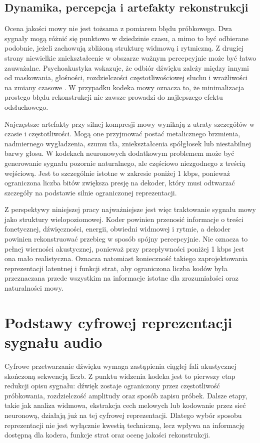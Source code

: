 \subsection{Dynamika, percepcja i artefakty rekonstrukcji}
\label{subsec:dynamika-percepcja-artefakty}

Ocena jakości mowy nie jest tożsama z pomiarem błędu próbkowego. Dwa sygnały mogą różnić się punktowo w dziedzinie czasu, a mimo to być odbierane podobnie, jeżeli zachowują zbliżoną strukturę widmową i rytmiczną. Z drugiej strony niewielkie zniekształcenie w obszarze ważnym percepcyjnie może być łatwo zauważalne. Psychoakustyka wskazuje, że odbiór dźwięku zależy między innymi od maskowania, głośności, rozdzielczości częstotliwościowej słuchu i wrażliwości na zmiany czasowe \cite{ZwickerFastl1999Psychoacoustics}. W przypadku kodeka mowy oznacza to, że minimalizacja prostego błędu rekonstrukcji nie zawsze prowadzi do najlepszego efektu odsłuchowego.

Najczęstsze artefakty przy silnej kompresji mowy wynikają z utraty szczegółów w czasie i częstotliwości. Mogą one przyjmować postać metalicznego brzmienia, nadmiernego wygładzenia, szumu tła, zniekształcenia spółgłosek lub niestabilnej barwy głosu. W kodekach neuronowych dodatkowym problemem może być generowanie sygnału pozornie naturalnego, ale częściowo niezgodnego z treścią wejściową. Jest to szczególnie istotne w zakresie poniżej 1 kbps, ponieważ ograniczona liczba bitów zwiększa presję na dekoder, który musi odtwarzać szczegóły na podstawie silnie ograniczonej reprezentacji.

Z perspektywy niniejszej pracy najważniejsze jest więc traktowanie sygnału mowy jako struktury wielopoziomowej. Koder powinien przenosić informacje o treści fonetycznej, dźwięczności, energii, obwiedni widmowej i rytmie, a dekoder powinien rekonstruować przebieg w sposób spójny percepcyjnie. Nie oznacza to pełnej wierności akustycznej, ponieważ przy przepływności poniżej 1 kbps jest ona mało realistyczna. Oznacza natomiast konieczność takiego zaprojektowania reprezentacji latentnej i funkcji strat, aby ograniczona liczba kodów była przeznaczana przede wszystkim na informacje istotne dla zrozumiałości oraz naturalności mowy.

\section{Podstawy cyfrowej reprezentacji sygnału audio}
\label{sec:cyfrowa-reprezentacja-audio}

Cyfrowe przetwarzanie dźwięku wymaga zastąpienia ciągłej fali akustycznej skończoną sekwencją liczb. Z punktu widzenia kodeka jest to pierwszy etap redukcji opisu sygnału: dźwięk zostaje ograniczony przez częstotliwość próbkowania, rozdzielczość amplitudy oraz sposób zapisu próbek. Dalsze etapy, takie jak analiza widmowa, ekstrakcja cech melowych lub kodowanie przez sieć neuronową, działają już na tej cyfrowej reprezentacji. Dlatego wybór sposobu reprezentacji nie jest wyłącznie kwestią techniczną, lecz wpływa na informację dostępną dla kodera, funkcje strat oraz ocenę jakości rekonstrukcji.

